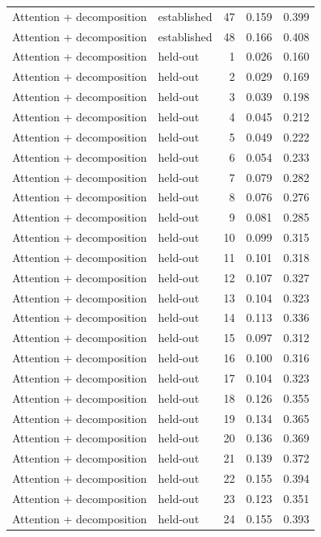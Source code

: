 \begin{tabular}{llrrr}
Attention + decomposition & established & 47 & 0.159 & 0.399 \\
Attention + decomposition & established & 48 & 0.166 & 0.408 \\
Attention + decomposition & held-out & 1 & 0.026 & 0.160 \\
Attention + decomposition & held-out & 2 & 0.029 & 0.169 \\
Attention + decomposition & held-out & 3 & 0.039 & 0.198 \\
Attention + decomposition & held-out & 4 & 0.045 & 0.212 \\
Attention + decomposition & held-out & 5 & 0.049 & 0.222 \\
Attention + decomposition & held-out & 6 & 0.054 & 0.233 \\
Attention + decomposition & held-out & 7 & 0.079 & 0.282 \\
Attention + decomposition & held-out & 8 & 0.076 & 0.276 \\
Attention + decomposition & held-out & 9 & 0.081 & 0.285 \\
Attention + decomposition & held-out & 10 & 0.099 & 0.315 \\
Attention + decomposition & held-out & 11 & 0.101 & 0.318 \\
Attention + decomposition & held-out & 12 & 0.107 & 0.327 \\
Attention + decomposition & held-out & 13 & 0.104 & 0.323 \\
Attention + decomposition & held-out & 14 & 0.113 & 0.336 \\
Attention + decomposition & held-out & 15 & 0.097 & 0.312 \\
Attention + decomposition & held-out & 16 & 0.100 & 0.316 \\
Attention + decomposition & held-out & 17 & 0.104 & 0.323 \\
Attention + decomposition & held-out & 18 & 0.126 & 0.355 \\
Attention + decomposition & held-out & 19 & 0.134 & 0.365 \\
Attention + decomposition & held-out & 20 & 0.136 & 0.369 \\
Attention + decomposition & held-out & 21 & 0.139 & 0.372 \\
Attention + decomposition & held-out & 22 & 0.155 & 0.394 \\
Attention + decomposition & held-out & 23 & 0.123 & 0.351 \\
Attention + decomposition & held-out & 24 & 0.155 & 0.393 \\

\end{tabular}
